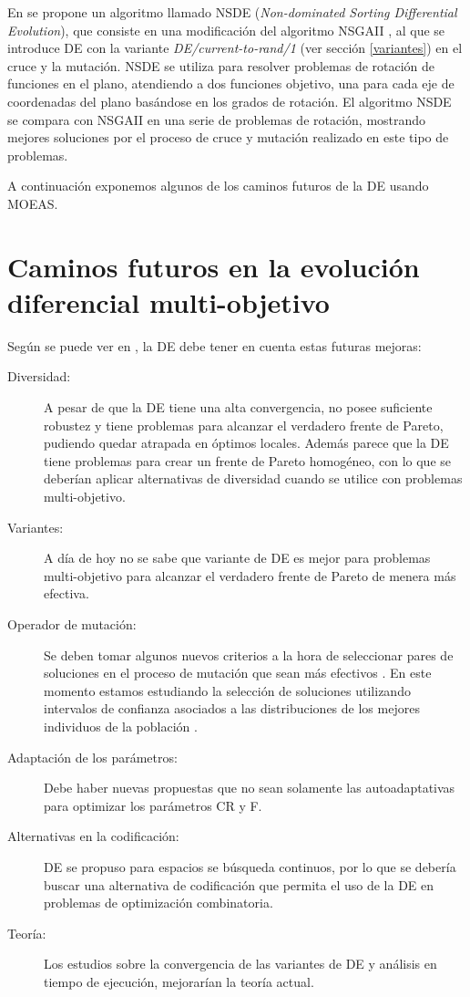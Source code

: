 En \cite{Iorio2004} se propone un algoritmo llamado NSDE (\textit{Non-dominated Sorting
Differential Evolution}), que consiste en una modificación del algoritmo NSGAII
\cite{Deb2002}, al que se introduce DE con la variante \textit{DE/current-to-rand/1} (ver
sección \ref{variantes}) en el cruce y la mutación. NSDE se utiliza para resolver problemas
de rotación de funciones en el plano, atendiendo a dos funciones objetivo, una para cada
eje de coordenadas del plano basándose en los grados de rotación. El algoritmo NSDE se
compara con NSGAII en una serie de problemas de rotación, mostrando mejores
soluciones por el proceso de cruce y mutación realizado en este tipo de problemas.

A continuación exponemos algunos de los caminos futuros de la DE usando MOEAS.

\section{Caminos futuros en la evolución diferencial multi-objetivo}
\noindent Según se puede ver en \cite{Mezuza2008}, la DE debe tener en cuenta estas
futuras
mejoras:
\begin{description}
	\item[Diversidad:] A pesar de que la DE tiene una alta convergencia, no posee
suficiente robustez y tiene problemas para alcanzar el verdadero frente de Pareto,
pudiendo quedar atrapada en óptimos locales. Además parece que la DE tiene problemas para
crear un frente de Pareto homogéneo, con lo que se deberían aplicar alternativas de
diversidad cuando se utilice con problemas multi-objetivo.
	\item[Variantes:] A día de hoy no se sabe que variante de DE es mejor para problemas
multi-objetivo para alcanzar el verdadero frente de Pareto de menera más efectiva.
	\item[Operador de mutación:] Se deben tomar algunos nuevos criterios a la hora de
seleccionar pares de soluciones en el proceso de mutación que sean más efectivos
\cite{Iorio2006}. En este momento estamos estudiando la selección de soluciones utilizando
intervalos  de confianza asociados a las distribuciones de los mejores individuos de la población
\cite{Cruz2010}.
	\item [Adaptación de los parámetros:] Debe haber nuevas propuestas que no sean
solamente las autoadaptativas \cite{Abbass2002,Abbass2003} para optimizar los parámetros
CR y F.
	\item[Alternativas en la codificación:] DE se propuso para espacios se búsqueda
continuos, por lo que se debería buscar una alternativa de codificación que permita el
uso de la DE en problemas de optimización combinatoria.
	\item[Teoría:] Los estudios sobre la convergencia de las variantes de DE y análisis en
tiempo de ejecución, mejorarían la teoría actual.
 \end{description}

